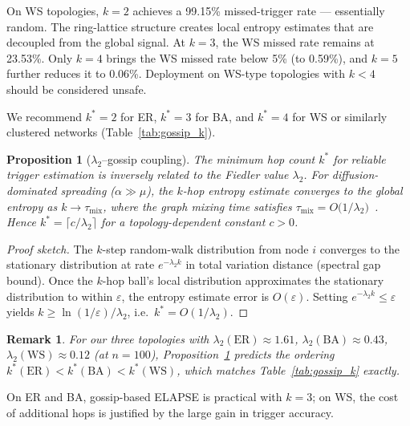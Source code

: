\documentclass[review,12pt]{elsarticle}
\newcommand{\lambdat}{\lambda_2}
\newtheorem{proposition}{Proposition}
\newtheorem{remark}{Remark}
\begin{document}
On WS topologies, $k=2$ achieves a 99.15\% missed-trigger rate — essentially
random. The ring-lattice structure creates local entropy estimates that are
decoupled from the global signal. At $k=3$, the WS missed rate remains at
23.53\%. Only $k=4$ brings the WS missed rate below 5\% (to 0.59\%), and
$k=5$ further reduces it to 0.06\%.  Deployment on WS-type topologies
with $k < 4$ should be considered unsafe.

We recommend $k^* = 2$ for ER, $k^* = 3$ for BA, and $k^* = 4$ for WS
or similarly clustered networks (Table~\ref{tab:gossip_k}).

\begin{proposition}[$\lambdat$--gossip coupling]
\label{prop:gossip_lambda}
The minimum hop count $k^*$ for reliable trigger estimation is inversely
related to the Fiedler value $\lambdat$.  For diffusion-dominated spreading
($\alpha \gg \mu$), the $k$-hop entropy estimate converges to the global
entropy as $k \to \tau_{\mathrm{mix}}$, where the graph mixing time
satisfies $\tau_{\mathrm{mix}} = O\!\bigl(1/\lambdat\bigr)$~\cite{chung1997spectral}.
Hence $k^* = \lceil c/\lambdat \rceil$ for a topology-dependent constant $c > 0$.
\end{proposition}

\begin{proof}[Proof sketch]
The $k$-step random-walk distribution from node $i$ converges to the
stationary distribution at rate $e^{-\lambdat k}$ in total variation
distance (spectral gap bound).  Once the $k$-hop ball's local distribution
approximates the stationary distribution to within $\varepsilon$, the
entropy estimate error is $O(\varepsilon)$.  Setting $e^{-\lambdat k} \leq \varepsilon$
yields $k \geq \ln(1/\varepsilon)/\lambdat$, i.e.\ $k^* = O(1/\lambdat)$.
\end{proof}

\begin{remark}
For our three topologies with $\lambdat(\mathrm{ER})\approx 1.61$,
$\lambdat(\mathrm{BA})\approx 0.43$, $\lambdat(\mathrm{WS})\approx 0.12$
(at $n=100$), Proposition~\ref{prop:gossip_lambda} predicts the ordering
$k^*(\mathrm{ER}) < k^*(\mathrm{BA}) < k^*(\mathrm{WS})$,
which matches Table~\ref{tab:gossip_k} exactly.
\end{remark}

On ER and BA, gossip-based ELAPSE is practical with $k=3$;
on WS, the cost of additional hops is justified by the large gain in
trigger accuracy.

\end{document}
